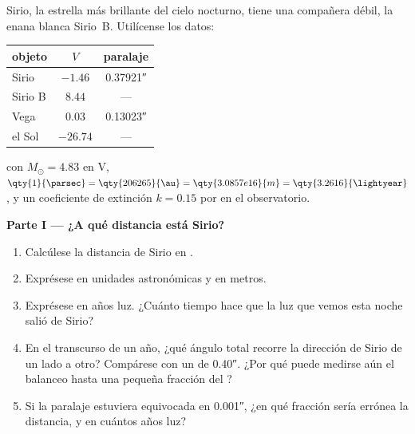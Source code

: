 \begin{problem}
\label{pb:b1:observing-the-sky:1}
Sirio, la estrella más brillante del cielo nocturno, tiene una compañera débil, la enana
blanca Sirio~B. Utilícense los datos:
\begin{center}
\small
\begin{tabular}{lcc}
\hline
objeto & $V$ & paralaje \\
\hline
Sirio & $-1.46$ & \ang{;;0.37921} \\
Sirio B & $8.44$ & --- \\
Vega & $0.03$ & \ang{;;0.13023} \\
el Sol & $-26.74$ & --- \\
\hline
\end{tabular}
\end{center}
con $M_\odot = 4.83$ en V, $\qty{1}{\parsec} = \qty{206265}{\au} =
\qty{3.0857e16}{m} = \qty{3.2616}{\lightyear}$, y un coeficiente de extinción
$k = 0.15$ por  en el observatorio.

\medskip
\noindent\textbf{Parte I --- ¿A qué distancia está Sirio?}
\begin{enumerate}
  \item Calcúlese la distancia de Sirio en .
  \item Exprésese en unidades astronómicas y en metros.
  \item Exprésese en años luz. ¿Cuánto tiempo hace que la luz que vemos esta noche
        salió de Sirio?
  \item En el transcurso de un año, ¿qué ángulo total recorre la dirección de Sirio de un
        lado a otro? Compárese con un  de \ang{;;0.40}. ¿Por qué puede medirse aún
        el balanceo hasta una pequeña fracción del ?
  \item Si la paralaje estuviera equivocada en \ang{;;0.001}, ¿en qué fracción sería
        errónea la distancia, y en cuántos años luz?
\end{enumerate}


\end{problem}
